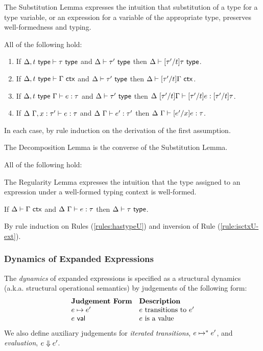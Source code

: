 The Substitution Lemma expresses the intuition that substitution of a type for a type variable, or an expression for a variable of the appropriate type, preserves well-formedness and typing. 
\begin{lemma}[Substitution] All of the following hold:
\begin{enumerate}
\item If $\Delta, t~\mathsf{type} \vdash \tau~\mathsf{type}$ and $\Delta \vdash \tau'~\mathsf{type}$ then $\Delta \vdash [\tau'/t]\tau~\mathsf{type}$.
\item If $\Delta, t~\mathsf{type} \vdash \Gamma~\mathsf{ctx}$ and $\Delta \vdash \tau'~\mathsf{type}$ then $\Delta \vdash [\tau'/t]\Gamma~\mathsf{ctx}$.
\item If $\Delta, t~\mathsf{type}~\Gamma \vdash e : \tau$ and $\Delta \vdash \tau'~\mathsf{type}$ then $\Delta~[\tau'/t]\Gamma \vdash [\tau'/t]e : [\tau'/t]\tau$.
\item If $\Delta~\Gamma, x : \tau' \vdash e : \tau$ and $\Delta~\Gamma \vdash e' : \tau'$ then $\Delta~\Gamma \vdash [e'/x]e : \tau$.
\end{enumerate}\end{lemma}
\begin{proof-sketch}
In each case, by rule induction on the derivation of the first assumption.
\end{proof-sketch}
The Decomposition Lemma is the converse of the Substitution Lemma.
\begin{lemma}[Decomposition] All of the following hold:
\end{lemma}
The Regularity Lemma expresses the intuition that the type assigned to an expression under a well-formed typing context is well-formed. 
\begin{lemma}[Regularity] If $\Delta \vdash \Gamma~\mathsf{ctx}$ and $\Delta~\Gamma \vdash e : \tau$ then $\Delta \vdash \tau~\mathsf{type}$.\end{lemma}
\begin{proof-sketch}
By rule induction on Rules (\ref{rules:hastypeU}) and inversion of Rule (\ref{rule:isctxU-ext}). 
\end{proof-sketch}
\subsubsection{Dynamics of Expanded Expressions}
The \emph{dynamics} of expanded expressions is specified as a structural dynamics (a.k.a. structural operational semantics) by judgements of the following form:
\[\begin{array}{ll}
\textbf{Judgement Form} & \textbf{Description}\\
e \mapsto e' & \text{$e$ transitions to $e'$}\\
e~\mathsf{val} & \text{$e$ is a value}
\end{array}\]
We also define auxiliary judgements for \emph{iterated transitions}, $e \mapsto^{*} e'$, and \emph{evaluation}, $e \Downarrow e'$.

